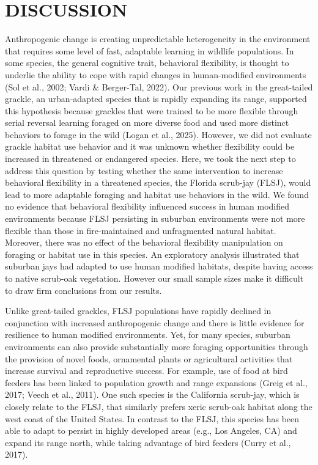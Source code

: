 \documentclass[
]{article}
\begin{document}
\section{\texorpdfstring{\textbf{DISCUSSION}}{DISCUSSION}}\label{discussion}

Anthropogenic change is creating unpredictable heterogeneity in the
environment that requires some level of fast, adaptable learning in
wildlife populations. In some species, the general cognitive trait,
behavioral flexibility, is thought to underlie the ability to cope with
rapid changes in human-modified environments (Sol et al., 2002; Vardi \&
Berger-Tal, 2022). Our previous work in the great-tailed grackle, an
urban-adapted species that is rapidly expanding its range, supported
this hypothesis because grackles that were trained to be more flexible
through serial reversal learning foraged on more diverse food and used
more distinct behaviors to forage in the wild (Logan et al., 2025).
However, we did not evaluate grackle habitat use behavior and it was
unknown whether flexibility could be increased in threatened or
endangered species. Here, we took the next step to address this question
by testing whether the same intervention to increase behavioral
flexibility in a threatened species, the Florida scrub-jay (FLSJ), would
lead to more adaptable foraging and habitat use behaviors in the wild.
We found no evidence that behavioral flexibility influenced success in
human modified environments because FLSJ persisting in suburban
environments were not more flexible than those in fire-maintained and
unfragmented natural habitat. Moreover, there was no effect of the
behavioral flexibility manipulation on foraging or habitat use in this
species. An exploratory analysis illustrated that suburban jays had
adapted to use human modified habitats, despite having access to native
scrub-oak vegetation. However our small sample sizes make it difficult
to draw firm conclusions from our results.

Unlike great-tailed grackles, FLSJ populations have rapidly declined in
conjunction with increased anthropogenic change and there is little
evidence for resilience to human modified environments. Yet, for many
species, suburban environments can also provide substantially more
foraging opportunities through the provision of novel foods, ornamental
plants or agricultural activities that increase survival and
reproductive success. For example, use of food at bird feeders has been
linked to population growth and range expansions (Greig et al., 2017;
Veech et al., 2011). One such species is the California scrub-jay, which
is closely relate to the FLSJ, that similarly prefers xeric scrub-oak
habitat along the west coast of the United States. In contrast to the
FLSJ, this species has been able to adapt to persist in highly developed
areas (e.g., Los Angeles, CA) and expand its range north, while taking
advantage of bird feeders (Curry et al., 2017).
\end{document}
